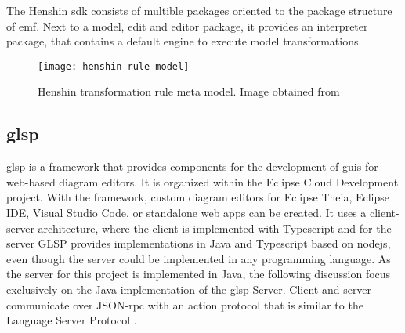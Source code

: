   The Henshin \acs{sdk} consists of multible packages oriented to the package structure of \ac{emf}. Next to a model, edit and editor package, it provides an interpreter package, that contains a default engine to execute model transformations.

  \begin{figure}[h]
    \centering
    \texttt{[image: henshin-rule-model]}
    \caption{Henshin transformation rule meta model. Image obtained from \cite{henshin-repo}}
    \label{fig:henshin-rule-model}
  \end{figure}


  \subsection{\acf{glsp}}
  \label{subsec:glsp}

  \ac{glsp} is a framework that provides components for the development of \acsp{gui} for web-based diagram editors.
  \cite{glsp-repo} It is organized within the Eclipse Cloud Development project. \cite{glsp-doc} With the framework, custom diagram editors for Eclipse Theia, Eclipse IDE, Visual Studio Code, or standalone web apps can be created. It uses a client-server architecture, where the client is implemented with Typescript and for the server GLSP provides implementations in Java and Typescript based on nodejs, even though the server could be implemented in any programming language. As the server for this project is implemented in Java, the following discussion focus exclusively on the Java implementation of the \ac{glsp} Server. Client and server communicate over JSON-\acs{rpc} with an action protocol that is similar to the Language Server Protocol \cite{lsp-repo}. 

